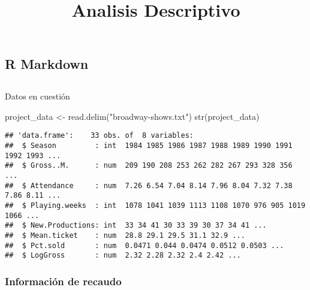 \documentclass[
]{article}
\title{Analisis Descriptivo}
\author{}
\date{\vspace{-2.5em}}
\newenvironment{Shaded}{\begin{snugshade}}{\end{snugshade}}
\newcommand{\FunctionTok}[1]{\textcolor[rgb]{0.00,0.00,0.00}{#1}}
\newcommand{\NormalTok}[1]{#1}
\newcommand{\OtherTok}[1]{\textcolor[rgb]{0.56,0.35,0.01}{#1}}
\newcommand{\SpecialCharTok}[1]{\textcolor[rgb]{0.00,0.00,0.00}{#1}}
\newcommand{\StringTok}[1]{\textcolor[rgb]{0.31,0.60,0.02}{#1}}
\begin{document}
\maketitle

\hypertarget{r-markdown}{%
\subsection{R Markdown}\label{r-markdown}}

\hypertarget{section}{%
\subsection{}\label{section}}

Datos en cuestión

\begin{Shaded}
\begin{Highlighting}[]
\NormalTok{project\_data }\OtherTok{\textless{}{-}} \FunctionTok{read.delim}\NormalTok{(}\StringTok{"broadway{-}shows.txt"}\NormalTok{)}
\FunctionTok{str}\NormalTok{(project\_data)}
\end{Highlighting}
\end{Shaded}

\begin{verbatim}
## 'data.frame':    33 obs. of  8 variables:
##  $ Season         : int  1984 1985 1986 1987 1988 1989 1990 1991 1992 1993 ...
##  $ Gross..M.      : num  209 190 208 253 262 282 267 293 328 356 ...
##  $ Attendance     : num  7.26 6.54 7.04 8.14 7.96 8.04 7.32 7.38 7.86 8.11 ...
##  $ Playing.weeks  : int  1078 1041 1039 1113 1108 1070 976 905 1019 1066 ...
##  $ New.Productions: int  33 34 41 30 33 39 30 37 34 41 ...
##  $ Mean.ticket    : num  28.8 29.1 29.5 31.1 32.9 ...
##  $ Pct.sold       : num  0.0471 0.044 0.0474 0.0512 0.0503 ...
##  $ LogGross       : num  2.32 2.28 2.32 2.4 2.42 ...
\end{verbatim}

\hypertarget{informaciuxf3n-de-recaudo}{%
\subsubsection{Información de recaudo}\label{informaciuxf3n-de-recaudo}}

\begin{Shaded}
\end{Shaded}
\end{document}
